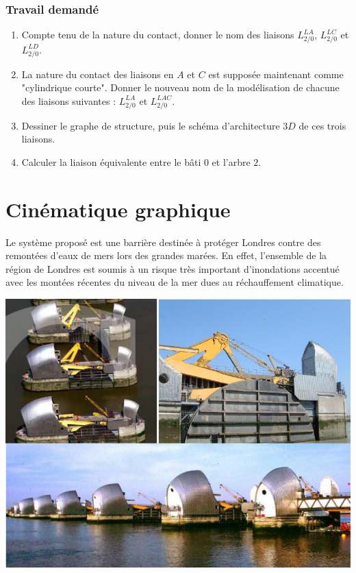 \subsubsection{Travail demandé}
\begin{enumerate}
\item Compte tenu de la nature du contact, donner le nom des liaisons $L_{2/0}^{LA}$, $L_{2/0}^{LC}$ et $L_{2/0}^{LD}$.
\item La nature du contact des liaisons en $A$ et $C$ est suppos\'ee maintenant comme "cylindrique courte". Donner le nouveau nom de la mod\'elisation de chacune des liaisons suivantes : $L_{2/0}^{LA}$ et $L_{2/0}^{LAC}$.
\item Dessiner le graphe de structure, puis le sch\'ema d'architecture $3D$ de ces trois liaisons.
\item Calculer la liaison \'equivalente entre le b\^ati $0$ et l'arbre $2$.
\end{enumerate}

\newpage



\section{Cinématique graphique}
Le système proposé est une barrière destinée à protéger Londres contre des remontées
d'eaux de mers lors des grandes marées. En effet, l'ensemble de la région de Londres est soumis à un
risque très important d'inondations accentué avec les montées récentes du niveau de la mer dues au
réchauffement climatique.


\begin{center}
\includegraphics[width=.8\textwidth]{png/img11}
\end{center}

